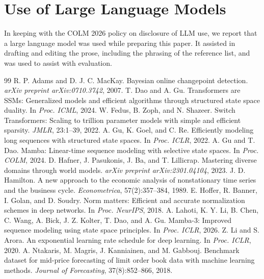 \documentclass{article}
\begin{document}
\section*{Use of Large Language Models}
In keeping with the COLM 2026 policy on disclosure of LLM use, we report that a large language model was used while preparing this paper. It assisted in drafting and editing the prose, including the phrasing of the reference list, and was used to assist with evaluation.


\begin{thebibliography}{99}
 R. P. Adams and D. J. C. MacKay. Bayesian online changepoint detection. \emph{arXiv preprint arXiv:0710.3742}, 2007.
 T. Dao and A. Gu. Transformers are SSMs: Generalized models and efficient algorithms through structured state space duality. In \emph{Proc. ICML}, 2024.
 W. Fedus, B. Zoph, and N. Shazeer. Switch Transformers: Scaling to trillion parameter models with simple and efficient sparsity. \emph{JMLR}, 23:1--39, 2022.
 A. Gu, K. Goel, and C. Re. Efficiently modeling long sequences with structured state spaces. In \emph{Proc. ICLR}, 2022.
 A. Gu and T. Dao. Mamba: Linear-time sequence modeling with selective state spaces. In \emph{Proc. COLM}, 2024.
 D. Hafner, J. Pasukonis, J. Ba, and T. Lillicrap. Mastering diverse domains through world models. \emph{arXiv preprint arXiv:2301.04104}, 2023.
 J. D. Hamilton. A new approach to the economic analysis of nonstationary time series and the business cycle. \emph{Econometrica}, 57(2):357--384, 1989.
 E. Hoffer, R. Banner, I. Golan, and D. Soudry. Norm matters: Efficient and accurate normalization schemes in deep networks. In \emph{Proc. NeurIPS}, 2018.
 A. Lahoti, K. Y. Li, B. Chen, C. Wang, A. Bick, J. Z. Kolter, T. Dao, and A. Gu. Mamba-3: Improved sequence modeling using state space principles. In \emph{Proc. ICLR}, 2026.
 Z. Li and S. Arora. An exponential learning rate schedule for deep learning. In \emph{Proc. ICLR}, 2020.
 A. Ntakaris, M. Magris, J. Kanniainen, and M. Gabbouj. Benchmark dataset for mid-price forecasting of limit order book data with machine learning methods. \emph{Journal of Forecasting}, 37(8):852--866, 2018.

\end{thebibliography}
\end{document}
